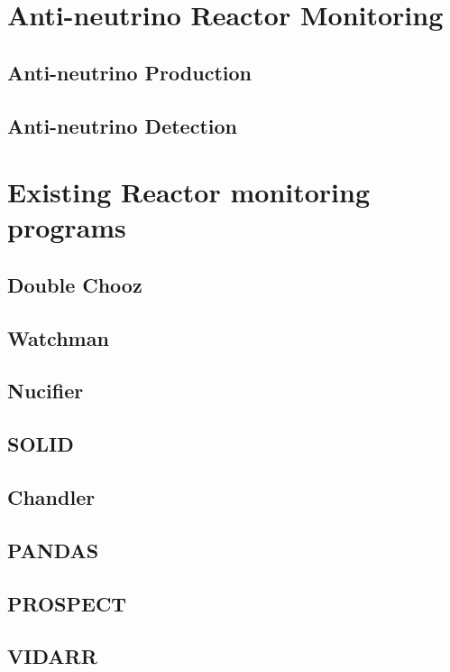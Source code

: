 \documentclass[12pt,a4paper]{article}
\begin{document}
\section{Anti-neutrino Reactor Monitoring}
\subsection{Anti-neutrino Production}
\subsection{Anti-neutrino Detection}

\section{Existing Reactor monitoring programs}
\subsection{Double Chooz}
\subsection{Watchman}
\subsection{Nucifier}
\subsection{SOLID}
\subsection{Chandler}
\subsection{PANDAS}
\subsection{PROSPECT}
\subsection{VIDARR}

% 
%
\printbibliography
\end{document}
